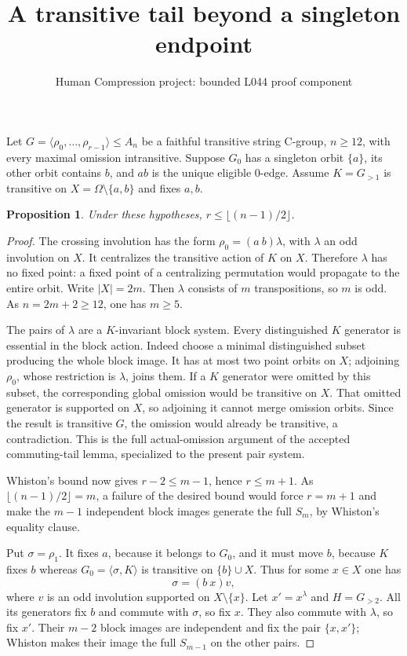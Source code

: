 \documentclass[11pt,a4paper]{article}
\title{A transitive tail beyond a singleton endpoint}
\author{Human Compression project: bounded L044 proof component}
\date{}
\newtheorem{proposition}{Proposition}
\newcommand{\gen}[1]{\langle#1\rangle}
\begin{document}
\maketitle
Let $G=\gen{\rho_0,\ldots,\rho_{r-1}}\leq A_n$ be a faithful
transitive string C-group, $n\geq12$, with every maximal
omission intransitive. Suppose $G_0$ has a singleton orbit
$\{a\}$, its other orbit contains $b$, and $ab$ is the unique
eligible $0$-edge. Assume $K=G_{>1}$ is transitive on
$X=\Omega\setminus\{a,b\}$ and fixes $a,b$.

\begin{proposition}
Under these hypotheses, $r\leq\lfloor(n-1)/2\rfloor$.
\end{proposition}
\begin{proof}
The crossing involution has the form
$\rho_0=(a\ b)\lambda$, with $\lambda$ an odd involution on
$X$. It centralizes the transitive action of $K$ on $X$.
Therefore $\lambda$ has no fixed point: a fixed point of a
centralizing permutation would propagate to the entire orbit.
Write $|X|=2m$. Then $\lambda$ consists of $m$ transpositions,
so $m$ is odd. As $n=2m+2\geq12$, one has $m\geq5$.

The pairs of $\lambda$ are a $K$-invariant block system.
Every distinguished $K$ generator is essential in the block
action. Indeed choose a minimal distinguished subset producing
the whole block image. It has at most two point orbits on $X$;
adjoining $\rho_0$, whose restriction is $\lambda$, joins
them. If a $K$ generator were omitted by this subset, the
corresponding global omission would be transitive on $X$.
That omitted generator is supported on $X$, so adjoining it
cannot merge omission orbits. Since the result is transitive
$G$, the omission would already be transitive, a contradiction.
This is the full actual-omission argument of the accepted
commuting-tail lemma, specialized to the present pair system.

Whiston's bound now gives $r-2\leq m-1$, hence $r\leq m+1$.
As $\lfloor(n-1)/2\rfloor=m$, a failure of the desired bound
would force $r=m+1$ and make the $m-1$ independent block images
generate the full $S_m$, by Whiston's equality clause.

Put $\sigma=\rho_1$. It fixes $a$, because it belongs to $G_0$,
and it must move $b$, because $K$ fixes $b$ whereas
$G_0=\gen{\sigma,K}$ is transitive on $\{b\}\cup X$.
Thus for some $x\in X$ one has
\[
                       \sigma=(b\ x)v,
\]
where $v$ is an odd involution supported on $X\setminus\{x\}$.
Let $x'=x^\lambda$ and $H=G_{>2}$. All its generators fix $b$
and commute with $\sigma$, so fix $x$. They also commute with
$\lambda$, so fix $x'$. Their $m-2$ block images are independent
and fix the pair $\{x,x'\}$; Whiston makes their image the full
$S_{m-1}$ on the other pairs.


\end{proof}
\end{document}
